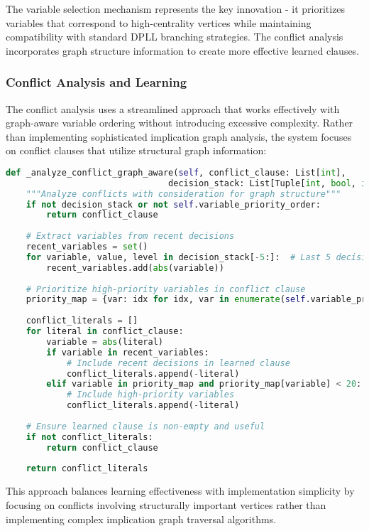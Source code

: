 The variable selection mechanism represents the key innovation - it prioritizes variables that correspond to high-centrality vertices while maintaining compatibility with standard DPLL branching strategies. The conflict analysis incorporates graph structure information to create more effective learned clauses.

\subsubsection{Conflict Analysis and Learning}

The conflict analysis uses a streamlined approach that works effectively with graph-aware variable ordering without introducing excessive complexity. Rather than implementing sophisticated implication graph analysis, the system focuses on conflict clauses that utilize structural graph information:

\begin{lstlisting}[language=Python, caption=Graph-Aware Conflict Analysis]
def _analyze_conflict_graph_aware(self, conflict_clause: List[int], 
                                decision_stack: List[Tuple[int, bool, int]]) -> List[int]:
    """Analyze conflicts with consideration for graph structure"""
    if not decision_stack or not self.variable_priority_order:
        return conflict_clause
    
    # Extract variables from recent decisions
    recent_variables = set()
    for variable, value, level in decision_stack[-5:]:  # Last 5 decisions
        recent_variables.add(abs(variable))
    
    # Prioritize high-priority variables in conflict clause
    priority_map = {var: idx for idx, var in enumerate(self.variable_priority_order)}
    
    conflict_literals = []
    for literal in conflict_clause:
        variable = abs(literal)
        if variable in recent_variables:
            # Include recent decisions in learned clause
            conflict_literals.append(-literal)
        elif variable in priority_map and priority_map[variable] < 20:
            # Include high-priority variables
            conflict_literals.append(-literal)
    
    # Ensure learned clause is non-empty and useful
    if not conflict_literals:
        return conflict_clause
    
    return conflict_literals
\end{lstlisting}

This approach balances learning effectiveness with implementation simplicity by focusing on conflicts involving structurally important vertices rather than implementing complex implication graph traversal algorithms.

